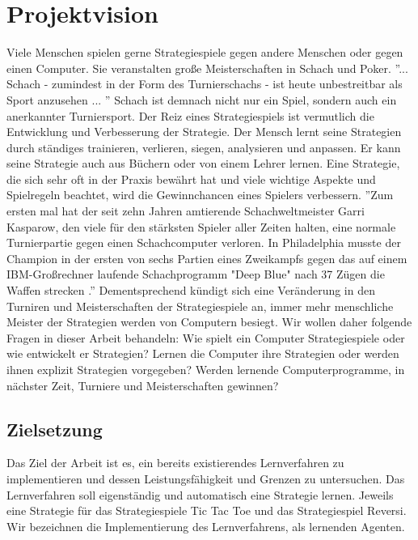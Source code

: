 \chapter{Projektvision}
\label{cha:projektvision}

Viele Menschen spielen gerne Strategiespiele gegen andere Menschen oder gegen einen Computer. Sie veranstalten große Meisterschaften in Schach und Poker. ''... Schach - zumindest in der Form des Turnierschachs - ist heute unbestreitbar als Sport anzusehen ... \cite{Weyer}'' Schach ist demnach nicht nur ein Spiel, sondern auch ein anerkannter Turniersport. Der Reiz eines Strategiespiels ist vermutlich die Entwicklung und Verbesserung der Strategie. Der Mensch lernt seine Strategien durch ständiges trainieren, verlieren, siegen, analysieren und anpassen. Er kann seine Strategie auch aus Büchern oder von einem Lehrer lernen. Eine Strategie, die sich sehr oft in der Praxis bewährt hat und viele wichtige Aspekte und Spielregeln beachtet, wird die Gewinnchancen eines Spielers verbessern. ''Zum ersten mal hat der seit zehn Jahren amtierende Schachweltmeister Garri Kasparow, den viele für den stärksten Spieler aller Zeiten halten, eine normale Turnierpartie gegen einen Schachcomputer verloren. In Philadelphia musste der Champion in der ersten von sechs Partien eines Zweikampfs gegen das auf einem IBM-Großrechner laufende Schachprogramm "Deep Blue" nach 37 Zügen die Waffen strecken \cite{Neander}.'' Dementsprechend kündigt sich eine Veränderung in den Turniren und Meisterschaften der Strategiespiele an, immer mehr menschliche Meister der Strategien werden von Computern besiegt. Wir wollen daher folgende Fragen in dieser Arbeit behandeln: Wie spielt ein Computer Strategiespiele oder wie entwickelt er Strategien? Lernen die Computer ihre Strategien oder werden ihnen explizit Strategien vorgegeben? Werden lernende Computerprogramme, in nächster Zeit, Turniere und Meisterschaften gewinnen? 
\newpage

\section{Zielsetzung}
Das Ziel der Arbeit ist es, ein bereits existierendes Lernverfahren zu implementieren und dessen Leistungsfähigkeit und Grenzen zu untersuchen. Das Lernverfahren soll eigenständig und automatisch eine Strategie lernen. Jeweils eine Strategie für das Strategiespiele Tic Tac Toe und das Strategiespiel Reversi. Wir bezeichnen die Implementierung des Lernverfahrens, als lernenden Agenten.\\  

